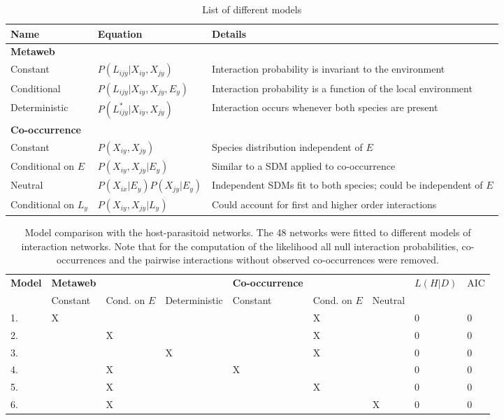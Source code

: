 \documentclass[12pt]{article}
\begin{document}
\newpage


\begin{table}[c]
	\centering
	\begin{tabular}{p{4cm}p{4cm}p{6cm}}
	\hline
	Name & Equation & Details \\
	\hline
	\textbf{Metaweb} &   &  \\
	Constant & $P(L_{ijy}|X_{iy},X_{jy})$ & Interaction probability is invariant to the environment \\
	Conditional & $P(L_{ijy}|X_{iy},X_{jy},E_y)$ & Interaction probability is a function of the local environment \\
	Deterministic & $P(L^*_{ijy}|X_{iy},X_{jy})$ & Interaction occurs whenever both species are present \\

	\textbf{Co-occurrence} & &\\
	Constant & $P(X_{iy},X_{jy})$ & Species distribution independent of $E$ \\
	Conditional on $E$ & $P(X_{iy},X_{jy} |E_y)$ & Similar to a SDM applied to co-occurrence \\
	Neutral & $P(X_{ix}|E_y)P(X_{jy}|E_y)$ & Independent SDMs fit to both species; could be independent of $E$ \\
	Conditional on $L_y$ & $P(X_{iy},X_{jy} | L_y)$ & Could account for first and higher order interactions \\
	\hline
	\end{tabular}
	\caption{List of different models}
\end{table}

\newpage


\begin{table}
	\centering
	\begin{tabular}{lllllllll}
	\hline
	\textbf{Model} & \textbf{Metaweb} & & & \textbf{Co-occurrence} & & & \textbf{$L(H|D)$} & AIC\\
	 & Constant & Cond. on $E$ & Deterministic & Constant & Cond. on $E$ & Neutral & & \\
	\hline
	1. & X & & &  & X & & 0 & 0 \\
	2. & & X & &  & X & & 0 & 0 \\
	3. & &  & X & & X & & 0 & 0 \\
	4. & & X & & X & & & 0 & 0 \\
	5. & & X & & & X & & 0 & 0 \\
	6. & & X & & & & X & 0 & 0 \\
	\hline
	\end{tabular}
	\caption{Model comparison with the host-parasitoid networks. The 48 networks were fitted to different models of interaction networks. Note that for the computation of the likelihood all null interaction probabilities, co-occurrences and the pairwise interactions without observed co-occurrences were removed.
}
\end{table}

\newpage
\end{document}

